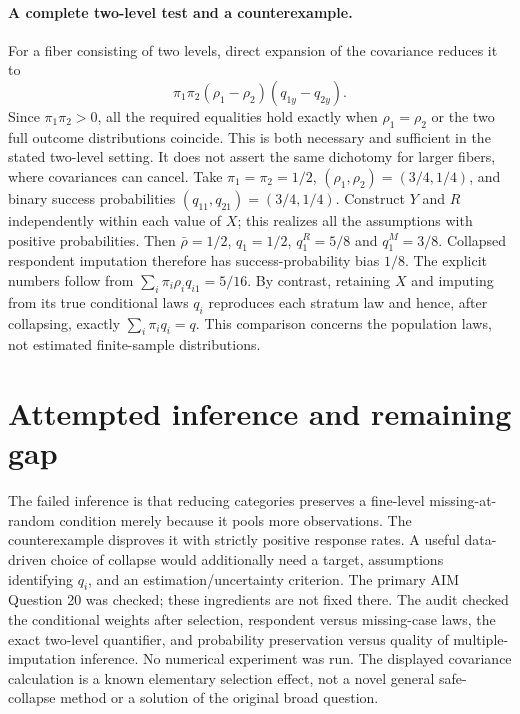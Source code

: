 \documentclass[11pt]{article}
\begin{document}
\paragraph{A complete two-level test and a counterexample.}
For a fiber consisting of two levels, direct expansion of the covariance
reduces it to
\[
\pi_1\pi_2(\rho_1-\rho_2)(q_{1y}-q_{2y}).
\]
Since $\pi_1\pi_2>0$, all the required equalities hold exactly when
$\rho_1=\rho_2$ or the two full outcome distributions coincide.
This is both necessary and sufficient in the stated two-level setting.
It does not assert the same dichotomy for larger fibers, where
covariances can cancel.
Take $\pi_1=\pi_2=1/2$, $(\rho_1,\rho_2)=(3/4,1/4)$, and binary
success probabilities $(q_{11},q_{21})=(3/4,1/4)$.
Construct $Y$ and $R$ independently within each value of $X$; this
realizes all the assumptions with positive probabilities. Then
$\bar\rho=1/2$, $q_1=1/2$, $q_1^R=5/8$ and $q_1^M=3/8$.
Collapsed respondent imputation therefore has success-probability bias
$1/8$. The explicit numbers follow from
$\sum_i\pi_i\rho_iq_{i1}=5/16$.
By contrast, retaining $X$ and imputing from its true conditional laws
$q_i$ reproduces each stratum law and hence, after collapsing, exactly
$\sum_i\pi_iq_i=q$. This comparison concerns the population laws,
not estimated finite-sample distributions.

\section{Attempted inference and remaining gap}
The failed inference is that reducing categories preserves a fine-level
missing-at-random condition merely because it pools more observations.
The counterexample disproves it with strictly positive response rates.
A useful data-driven choice of collapse would additionally need a target,
assumptions identifying $q_i$, and an estimation/uncertainty criterion.
The primary AIM Question 20 was checked; these ingredients are not fixed
there. The audit checked the conditional weights after selection,
respondent versus missing-case laws, the exact two-level quantifier, and
probability preservation versus quality of multiple-imputation inference.
No numerical experiment was run. The displayed covariance calculation is
a known elementary selection effect, not a novel general safe-collapse
method or a solution of the original broad question.
\end{document}
